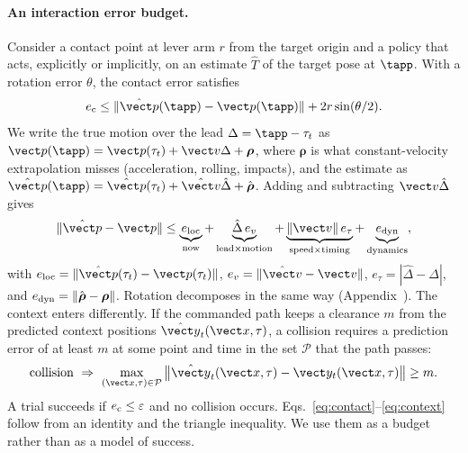 \paragraph{An interaction error budget.}
Consider a contact point at lever arm $r$ from the target origin and a policy that
acts, explicitly or implicitly, on an estimate $\hat T$ of the target pose at
$\tapp$. With a rotation error $\theta$, the contact error satisfies
\begin{equation}
e_{\rm c}\le\|\hat{\vect p}(\tapp)-\vect p(\tapp)\|+2r\sin(\theta/2).
\label{eq:contact}
\end{equation}
We write the true motion over the lead $\Delta=\tapp-\tau_t$ as
$\vect p(\tapp)=\vect p(\tau_t)+\vect v\Delta+\boldsymbol\rho$, where
$\boldsymbol\rho$ is what constant-velocity extrapolation misses (acceleration,
rolling, impacts), and the estimate as
$\hat{\vect p}(\tapp)=\hat{\vect p}(\tau_t)+\hat{\vect v}\hat\Delta+\hat{\boldsymbol\rho}$.
Adding and subtracting $\vect v\hat\Delta$ gives
\begin{equation}
\|\hat{\vect p}-\vect p\|\le
\underbrace{e_{\rm loc}}_{\text{now}}
+\underbrace{\hat\Delta\,e_{v}}_{\text{lead}\times\text{motion}}
+\underbrace{\|\vect v\|\,e_{\tau}}_{\text{speed}\times\text{timing}}
+\underbrace{e_{\rm dyn}}_{\text{dynamics}},
\label{eq:budget}
\end{equation}
with $e_{\rm loc}=\|\hat{\vect p}(\tau_t)-\vect p(\tau_t)\|$,
$e_v=\|\hat{\vect v}-\vect v\|$, $e_\tau=|\hat\Delta-\Delta|$, and
$e_{\rm dyn}=\|\hat{\boldsymbol\rho}-\boldsymbol\rho\|$. Rotation decomposes in the
same way (Appendix~). The context enters differently. If
the commanded path keeps a clearance $m$ from the predicted context positions
$\hat{\vect y}_t(\vect x,\tau)$, a collision requires a prediction error of at
least $m$ at some point and time in the set $\mathcal P$ that the path passes:
\begin{equation}
\text{collision}\ \Rightarrow\ \max_{(\vect x,\tau)\in\mathcal P}
\big\|\hat{\vect y}_t(\vect x,\tau)-\vect y_t(\vect x,\tau)\big\|\ge m .
\label{eq:context}
\end{equation}
A trial succeeds if $e_{\rm c}\le\varepsilon$ and no collision occurs.
Eqs.~\eqref{eq:contact}--\eqref{eq:context} follow from an identity and the
triangle inequality. We use them as a budget rather than as a model of success.

